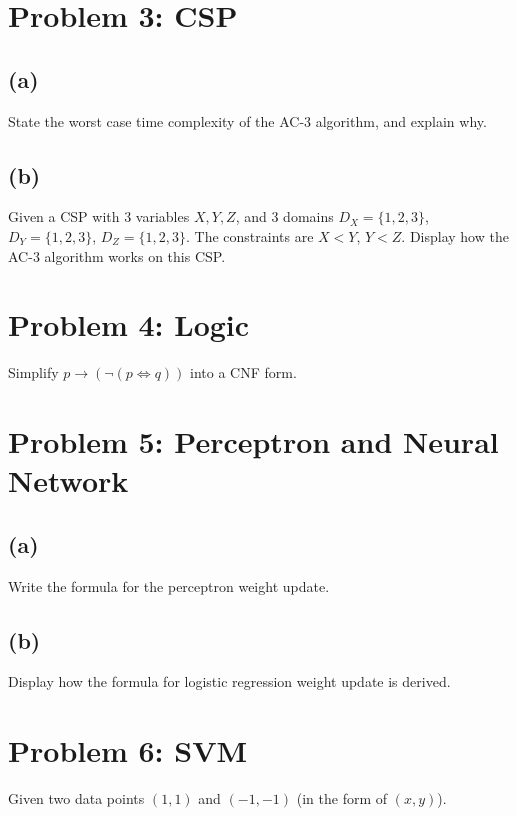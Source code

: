 \documentclass[a4paper,12pt]{article}
\begin{document}
\section*{Problem 3: CSP}

\subsection*{(a)}

State the worst case time complexity of the AC-3 algorithm, and explain why.

\subsection*{(b)}

Given a CSP with 3 variables $X, Y, Z$, and 3 domains $D_X = \{1, 2, 3\}$, $D_Y = \{1, 2, 3\}$, $D_Z = \{1, 2, 3\}$. The constraints are $X < Y$, $Y < Z$. Display how the AC-3 algorithm works on this CSP.

\section*{Problem 4: Logic}

Simplify $p \to (\neg (p \Leftrightarrow q))$ into a CNF form.

\section*{Problem 5: Perceptron and Neural Network}

\subsection*{(a)}

Write the formula for the perceptron weight update.

\subsection*{(b)}

Display how the formula for logistic regression weight update is derived.

\section*{Problem 6: SVM}

Given two data points $(1, 1)$ and $(-1, -1)$ (in the form of $(x, y)$).
\end{document}
